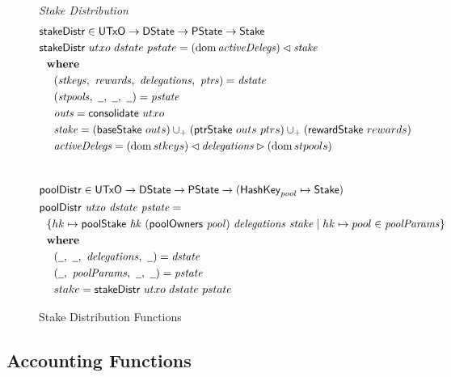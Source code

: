 \begin{figure}[htb]
  \emph{Stake Distribution}
  \begin{align*}
      & \fun{stakeDistr} \in \UTxO \to \DState \to \PState \to \Stake \\
      & \fun{stakeDistr}~{utxo}~{dstate}~{pstate} =
          (\dom{\var{activeDelegs}})\restrictdom\var{stake}\\
      & \where \\
      & ~~~~ (\var{stkeys},~\var{rewards},~\var{delegations},~\var{ptrs}) = \var{dstate} \\
      & ~~~~ (\var{stpools},~\wcard,~\wcard,~\wcard) = \var{pstate} \\
      & ~~~~ \var{outs} = \fun{consolidate}~{utxo} \\
      & ~~~~ \var{stake} = (\fun{baseStake}~{outs})
                             \unionoverridePlus (\fun{ptrStake}~{outs}~{ptrs})
                             \unionoverridePlus (\fun{rewardStake}~{rewards}) \\
      & ~~~~ \var{activeDelegs} =
               (\dom{stkeys}) \restrictdom \var{delegations} \restrictrange (\dom{stpools}) \\
      \nextdef
      & \fun{poolDistr} \in \UTxO \to \DState \to \PState \to (\HashKey_{pool} \mapsto \Stake) \\
      & \poolDistr{utxo}{dstate}{pstate} = \\
      & ~~ \{hk \mapsto \poolStake{hk}{(\fun{poolOwners}~\var{pool})}{delegations}{stake}
           \mid
           hk\mapsto pool \in \var{poolParams} \} \\
      & \where \\
      & ~~~~ (\wcard,~\wcard,~\var{delegations},~\wcard) = \var{dstate} \\
      & ~~~~ (\wcard,~\var{poolParams},~\wcard,~\wcard) = \var{pstate} \\
      & ~~~~ stake = \fun{stakeDistr}~{utxo}~{dstate}~{pstate}\\
  \end{align*}

  \caption{Stake Distribution Functions}
  \label{fig:functions:stake-distribution}
\end{figure}

\subsection{Accounting Functions}
\label{sec:acc-fun}

